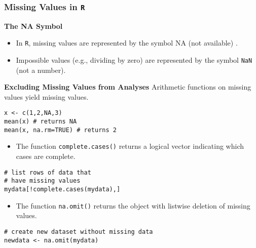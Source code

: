 \documentclass[MASTER.tex]{subfiles}
\begin{document}
\begin{frame}[fragile]
		\Large
		\frametitle{Missing Values in \texttt{R}}
		\noindent \textbf{The NA Symbol}
		\begin{itemize}
\item In \texttt{R}, missing values are represented by the symbol NA (not available) . 
\item Impossible values (e.g., dividing by zero) are represented by the symbol \texttt{NaN} (not a number). 

\end{itemize}
\end{frame}
\begin{frame}[fragile]
	\Large
\noindent \textbf{Excluding Missing Values from Analyses}
Arithmetic functions on missing values yield missing values.
	\begin{framed}
		\begin{verbatim}
x <- c(1,2,NA,3)
mean(x) # returns NA
mean(x, na.rm=TRUE) # returns 2
\end{verbatim}
\end{framed}
\end{frame}
\begin{frame}[fragile]
		\Large
\begin{itemize}
\item The function \texttt{complete.cases()} returns a logical vector indicating which cases are complete.
\end{itemize}		
	\begin{framed}
		\begin{verbatim}
# list rows of data that 
# have missing values 
mydata[!complete.cases(mydata),]
\end{verbatim}
\end{framed}
	\end{frame}
	\begin{frame}[fragile]
		\Large
\begin{itemize}
\item The function \texttt{na.omit()} returns the object with listwise deletion of missing values.
\end{itemize}

\begin{framed}
\begin{verbatim}	
# create new dataset without missing data 
newdata <- na.omit(mydata)
\end{verbatim}
\end{framed}
\end{frame}	
\end{document}
